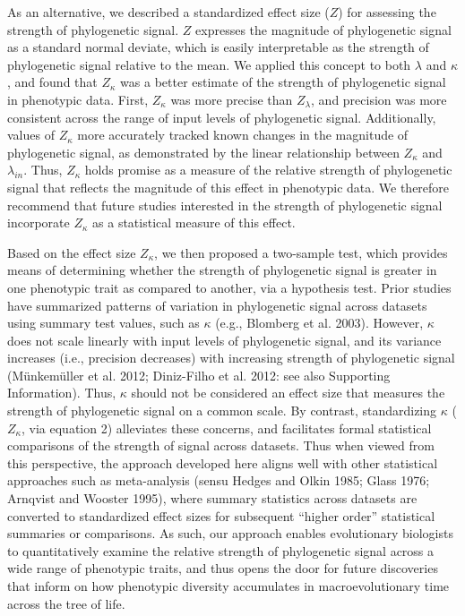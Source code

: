 \documentclass[
]{article}
\begin{document}
{As an alternative, we described a standardized effect size (\(Z\)) for
assessing the strength of phylogenetic signal. \(Z\) expresses the
magnitude of phylogenetic signal as a standard normal deviate, which is
easily interpretable as the strength of phylogenetic signal relative to
the mean. We applied this concept to both \(\lambda\) and \(\kappa\),
and found that \(Z_\kappa\) was a better estimate of the strength of
phylogenetic signal in phenotypic data. First, \(Z_\kappa\) was more
precise than \(Z_\lambda\), and precision was more consistent across the
range of input levels of phylogenetic signal. Additionally, values of
\(Z_\kappa\) more accurately tracked known changes in the magnitude of
phylogenetic signal, as demonstrated by the linear relationship between
\(Z_\kappa\) and \(\lambda_{in}\). Thus, \(Z_\kappa\) holds promise as a
measure of the relative strength of phylogenetic signal that reflects
the magnitude of this effect in phenotypic data. We therefore recommend
that future studies interested in the strength of phylogenetic signal
incorporate \(Z_\kappa\) as a statistical measure of this effect.
\hfill\break

Based on the effect size \(Z_\kappa\), we then proposed a two-sample
test, which provides means of determining whether the strength of
phylogenetic signal is greater in one phenotypic trait as compared to
another, via a hypothesis test. Prior studies have summarized patterns
of variation in phylogenetic signal across datasets using summary test
values, such as \(\kappa\) (e.g., Blomberg et al. 2003). However,
\(\kappa\) does not scale linearly with input levels of phylogenetic
signal, and its variance increases (i.e., precision decreases) with
increasing strength of phylogenetic signal (Münkemüller et al. 2012;
Diniz-Filho et al. 2012: see also Supporting Information). Thus,
\(\kappa\) should not be considered an effect size that measures the
strength of phylogenetic signal on a common scale. By contrast,
standardizing \(\kappa\) (\(Z_\kappa\), via equation 2) alleviates these
concerns, and facilitates formal statistical comparisons of the strength
of signal across datasets. Thus when viewed from this perspective, the
approach developed here aligns well with other statistical approaches
such as meta-analysis (sensu Hedges and Olkin 1985; Glass 1976; Arnqvist
and Wooster 1995), where summary statistics across datasets are
converted to standardized effect sizes for subsequent ``higher order''
statistical summaries or comparisons. As such, our approach enables
evolutionary biologists to quantitatively examine the relative strength
of phylogenetic signal across a wide range of phenotypic traits, and
thus opens the door for future discoveries that inform on how phenotypic
diversity accumulates in macroevolutionary time across the tree of life.
\hfill\break

}
\end{document}
